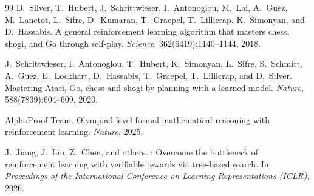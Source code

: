 \documentclass{article}
\begin{document}
\begin{thebibliography}{99}
D.~Silver, T.~Hubert, J.~Schrittwieser, I.~Antonoglou, M.~Lai, A.~Guez, M.~Lanctot, L.~Sifre, D.~Kumaran, T.~Graepel, T.~Lillicrap, K.~Simonyan, and D.~Hassabis.
\newblock A general reinforcement learning algorithm that masters chess, shogi, and {G}o through self-play.
\newblock \emph{Science}, 362(6419):1140--1144, 2018.

J.~Schrittwieser, I.~Antonoglou, T.~Hubert, K.~Simonyan, L.~Sifre, S.~Schmitt, A.~Guez, E.~Lockhart, D.~Hassabis, T.~Graepel, T.~Lillicrap, and D.~Silver.
\newblock Mastering {A}tari, {G}o, chess and shogi by planning with a learned model.
\newblock \emph{Nature}, 588(7839):604--609, 2020.

AlphaProof Team.
\newblock Olympiad-level formal mathematical reasoning with reinforcement learning.
\newblock \emph{Nature}, 2025.

J.~Jiang, J.~Liu, Z.~Chen, and others.
: Overcome the bottleneck of reinforcement learning with verifiable rewards via tree-based search.
\newblock In \emph{Proceedings of the International Conference on Learning Representations (ICLR)}, 2026.

\end{thebibliography}
\end{document}
